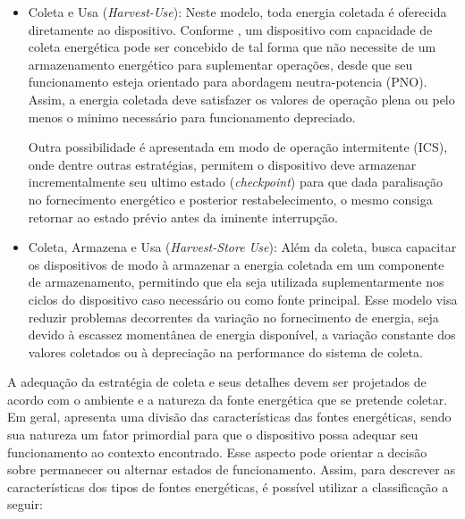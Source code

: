 \begin{itemize}
    \item Coleta e Usa (\textit{Harvest-Use}): Neste modelo, toda energia coletada é oferecida diretamente ao dispositivo. Conforme , um dispositivo com capacidade de coleta energética pode ser concebido de tal forma que não necessite de um armazenamento energético para suplementar operações, desde que seu funcionamento esteja orientado para abordagem neutra-potencia (\acl{PNO}). Assim, a energia coletada deve satisfazer os valores de operação plena ou pelo menos o minimo necessário para funcionamento depreciado.
        
     Outra possibilidade é apresentada em modo de operação intermitente (\acl{ICS}), onde dentre outras estratégias, permitem o dispositivo deve armazenar incrementalmente seu ultimo estado (\textit{checkpoint}) para que dada paralisação no fornecimento energético e posterior restabelecimento, o mesmo consiga retornar ao estado prévio antes da iminente interrupção. 
        
    \item Coleta, Armazena e Usa (\textit{Harvest-Store Use}): Além da coleta, busca capacitar os dispositivos de modo à armazenar a energia coletada em um componente de armazenamento, permitindo que ela seja utilizada suplementarmente nos ciclos do dispositivo caso necessário ou como fonte principal. Esse modelo visa reduzir problemas decorrentes da variação no fornecimento de energia, seja devido à escassez momentânea de energia disponível, a variação constante dos valores coletados ou à depreciação na performance do sistema de coleta.
    
\end{itemize}

A adequação da estratégia de coleta e seus detalhes devem ser projetados de acordo com o ambiente e a natureza da fonte energética que se pretende coletar. Em geral, \cite{shaikh_energy_2016} apresenta uma divisão das características das fontes energéticas, sendo sua natureza um fator primordial para que o dispositivo possa adequar seu funcionamento ao contexto encontrado. Esse aspecto pode orientar a decisão sobre permanecer ou alternar estados de funcionamento. Assim, para descrever as características dos tipos de fontes energéticas, é possível utilizar a classificação a seguir:

